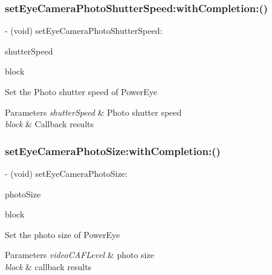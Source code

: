 \subsubsection{\texorpdfstring{set\+Eye\+Camera\+Photo\+Shutter\+Speed\+:with\+Completion\+:()}{setEyeCameraPhotoShutterSpeed:withCompletion:()}}
{\footnotesize\ttfamily -\/ (void) set\+Eye\+Camera\+Photo\+Shutter\+Speed\+: \begin{DoxyParamCaption}\item[{(P\+V\+Eye\+Camera\+Photo\+Shutter\+Speed)}]{shutter\+Speed }\item[{withCompletion:(P\+V\+Completion\+Block)}]{block }\end{DoxyParamCaption}}

Set the Photo shutter speed of Power\+Eye


\begin{DoxyParams}{Parameters}
{\em shutter\+Speed} & Photo shutter speed \\
\hline
{\em block} & Callback results \\
\hline
\end{DoxyParams}
\mbox{\label{interface_p_v_eye_camera_ae3d0344ef42065b309f9031bdd50b24a}} 
\subsubsection{\texorpdfstring{set\+Eye\+Camera\+Photo\+Size\+:with\+Completion\+:()}{setEyeCameraPhotoSize:withCompletion:()}}
{\footnotesize\ttfamily -\/ (void) set\+Eye\+Camera\+Photo\+Size\+: \begin{DoxyParamCaption}\item[{(P\+V\+Eye\+Camera\+Photo\+Size)}]{photo\+Size }\item[{withCompletion:(P\+V\+Completion\+Block)}]{block }\end{DoxyParamCaption}}

Set the photo size of Power\+Eye


\begin{DoxyParams}{Parameters}
{\em video\+C\+A\+F\+Level} & photo size \\
\hline
{\em block} & callback results \\
\hline
\end{DoxyParams}
\mbox{\label{interface_p_v_eye_camera_a3d11be57856ff0bf589aae8ba1385b9b}} 
